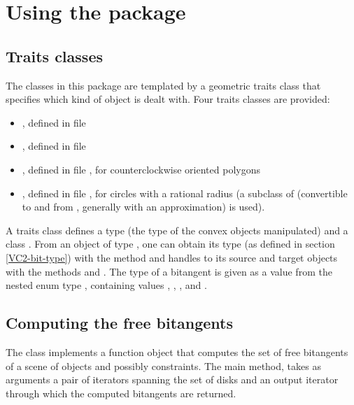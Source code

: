 \section{Using the package}

\subsection{Traits classes}
The classes in this package are templated by a geometric traits class that
specifies which kind of object is dealt with. Four traits classes are
provided:
\begin{itemize}
\item {}, defined in
file 
\item {}, defined in
file 
\item {}, defined in
file , for counterclockwise
oriented polygons
\item {}, defined in file
, for circles with a
rational radius (a subclass of  (convertible to and from
, generally with an approximation) is used).
\end{itemize}

A traits class defines a type  (the type of the convex objects
manipulated) and a class . From an object of type
, one can obtain its type (as defined in section
\ref{VC2-bit-type}) with the method  and handles to its source
and target objects with the methods  and
. The type of a bitangent is given as a value from the
nested enum type , containing values ,
, , and .

\subsection{Computing the free bitangents}
The class  implements a
function object that computes the set of free bitangents of a scene of
objects and possibly constraints. The main method,  takes
as arguments a pair of iterators spanning the set of disks and an output
iterator through which the computed bitangents are returned.

